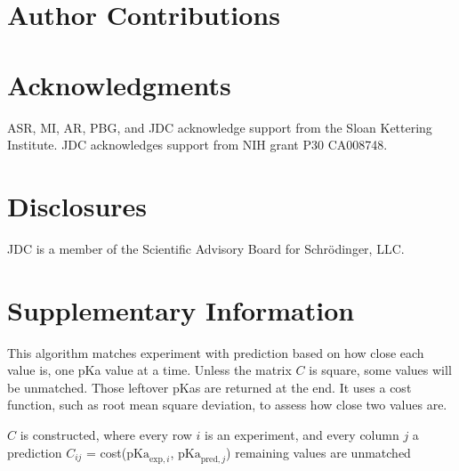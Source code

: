 \documentclass[9pt,lineno]{elife}
\newcommand{\pKa}{\mathrm{pKa}}
\begin{document}
\section{Author Contributions}


\section{Acknowledgments}

ASR, MI, AR, PBG, and JDC acknowledge support from the Sloan Kettering Institute.
JDC acknowledges support from NIH grant P30 CA008748.

\section{Disclosures}

JDC is a member of the Scientific Advisory Board for Schr\"{o}dinger, LLC.

\nocite{*} %




\appendix

\section{Supplementary Information}

\begin{algorithm}[H]
\SetAlgoLined
\caption{This algorithm matches experiment with prediction based on how close each value is, one pKa value at a time. Unless the matrix $C$ is square, some values will be unmatched. Those leftover pKas are returned at the end. It uses a cost function, such as root mean square deviation, to assess how close two values are.}
\label{alg:closest}
 
 $C$ is constructed, where every row  $i$ is an experiment, and every column $j$ a prediction\;
 $C_{ij}$ = cost($\pKa_{\text{exp},i}$, $\pKa_{\text{pred},j}$)\;
 remaining values are unmatched\;
\end{algorithm}
\end{document}
